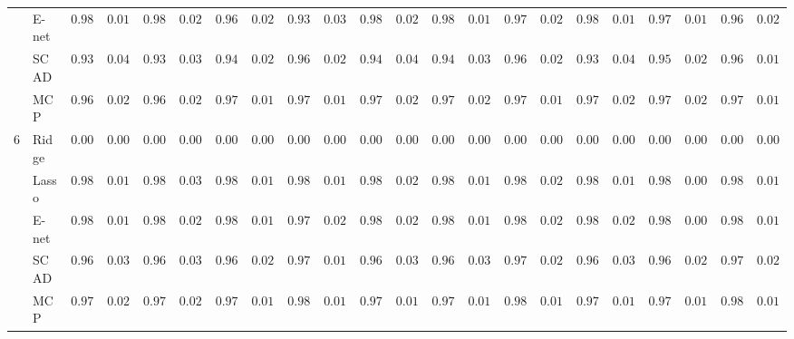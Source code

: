 \begin{tabular}{ll|ll|llllll|llllll|llllll}
 & E-net  & $0.9852$ & $0.0140$ & $0.9802$ & $0.0215$ & $0.9661$ & $0.0292$ & $0.9385$ & $0.0368$ & $0.9836$ & $0.0212$ & $0.9845$ & $0.0170$ & $0.9762$ & $0.0285$ & $0.9826$ & $0.0154$ & $0.9768$ & $0.0186$ & $0.9606$ & $0.0254$ \\
 & SCAD  & $0.9361$ & $0.0434$ & $0.9365$ & $0.0391$ & $0.9493$ & $0.0278$ & $0.9680$ & $0.0226$ & $0.9415$ & $0.0478$ & $0.9412$ & $0.0364$ & $0.9638$ & $0.0249$ & $0.9386$ & $0.0413$ & $0.9529$ & $0.0295$ & $0.9671$ & $0.0188$ \\
 & MCP  & $0.9672$ & $0.0254$ & $0.9662$ & $0.0282$ & $0.9769$ & $0.0140$ & $0.9795$ & $0.0123$ & $0.9739$ & $0.0204$ & $0.9734$ & $0.0210$ & $0.9762$ & $0.0193$ & $0.9709$ & $0.0214$ & $0.9723$ & $0.0219$ & $0.9766$ & $0.0142$ \\\hline
6 & Ridge  & $0.0000$ & $0.0000$ & $0.0000$ & $0.0000$ & $0.0000$ & $0.0000$ & $0.0000$ & $0.0000$ & $0.0000$ & $0.0000$ & $0.0000$ & $0.0000$ & $0.0000$ & $0.0000$ & $0.0000$ & $0.0000$ & $0.0000$ & $0.0000$ & $0.0000$ & $0.0000$ \\
 & Lasso  & $0.9871$ & $0.0152$ & $0.9837$ & $0.0335$ & $0.9848$ & $0.0137$ & $0.9805$ & $0.0151$ & $0.9873$ & $0.0211$ & $0.9865$ & $0.0162$ & $0.9847$ & $0.0236$ & $0.9868$ & $0.0193$ & $0.9882$ & $0.0066$ & $0.9851$ & $0.0111$ \\
 & E-net  & $0.9871$ & $0.0152$ & $0.9839$ & $0.0290$ & $0.9840$ & $0.0154$ & $0.9742$ & $0.0249$ & $0.9872$ & $0.0211$ & $0.9857$ & $0.0184$ & $0.9841$ & $0.0247$ & $0.9867$ & $0.0203$ & $0.9881$ & $0.0074$ & $0.9828$ & $0.0157$ \\
 & SCAD  & $0.9636$ & $0.0389$ & $0.9613$ & $0.0357$ & $0.9648$ & $0.0268$ & $0.9734$ & $0.0182$ & $0.9633$ & $0.0385$ & $0.9617$ & $0.0359$ & $0.9715$ & $0.0286$ & $0.9602$ & $0.0381$ & $0.9671$ & $0.0279$ & $0.9719$ & $0.0238$ \\
 & MCP  & $0.9758$ & $0.0235$ & $0.9761$ & $0.0209$ & $0.9798$ & $0.0137$ & $0.9819$ & $0.0108$ & $0.9793$ & $0.0177$ & $0.9773$ & $0.0176$ & $0.9818$ & $0.0159$ & $0.9797$ & $0.0158$ & $0.9792$ & $0.0160$ & $0.9803$ & $0.0149$ \\
\hline 
\end{tabular}

